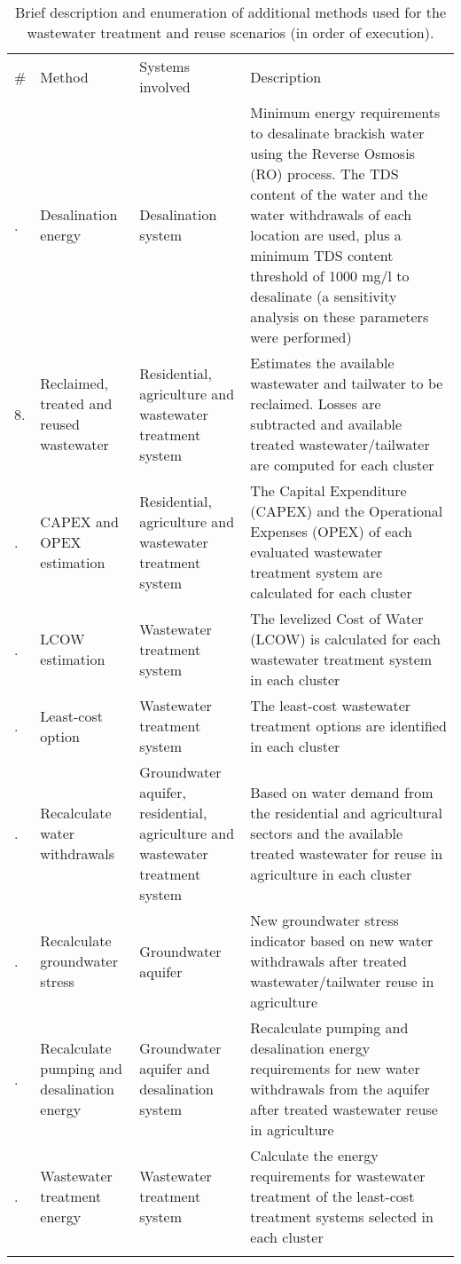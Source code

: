 \begin{table*}[!b]
    \caption{\label{tbl:methodsScenarios}Brief description and enumeration of additional methods used for the wastewater treatment and reuse scenarios (in order of execution).}
	\footnotesize{
	\begin{tabular}{@{}l P{1.1in} P{1.2in} P{3.12in}}
		\br
		\# & Method & Systems involved & Description\\
	    . & Desalination energy & Desalination system & Minimum energy requirements to desalinate brackish water using the Reverse Osmosis (RO) process. The TDS content of the water and the water withdrawals of each location are used, plus a minimum TDS content threshold of 1000 mg/l to desalinate (a sensitivity analysis on these parameters were performed) \\
	    8. & Reclaimed, treated and reused wastewater & Residential, agriculture and wastewater treatment system & Estimates the available wastewater and tailwater to be reclaimed. Losses are subtracted and available treated wastewater/tailwater are computed for each cluster \\
	    . & CAPEX and OPEX estimation & Residential, agriculture and wastewater treatment system & The Capital Expenditure (CAPEX) and the Operational Expenses (OPEX) of each evaluated wastewater treatment system are calculated for each cluster \\
	    . & LCOW estimation & Wastewater treatment system & The levelized Cost of Water (LCOW) is calculated for each wastewater treatment system in each cluster\\
	    . & Least-cost option & Wastewater treatment system & The least-cost wastewater treatment options are identified in each cluster\\
	    . & Recalculate water withdrawals & Groundwater aquifer, residential, agriculture and wastewater treatment system & Based on water demand  from the residential and agricultural sectors and the available treated wastewater for reuse in agriculture in each cluster\\
	    . & Recalculate groundwater stress & Groundwater aquifer & New groundwater stress indicator based on new water withdrawals after treated wastewater/tailwater reuse in agriculture \\
	    . & Recalculate pumping and desalination energy & Groundwater aquifer and desalination system & Recalculate pumping and desalination energy requirements for new water withdrawals from the aquifer after treated wastewater reuse in agriculture\\
	    . & Wastewater treatment energy & Wastewater treatment system & Calculate the energy requirements for wastewater treatment of the least-cost treatment systems selected in each cluster\\
		\br
	\end{tabular}
	}
\end{table*}


